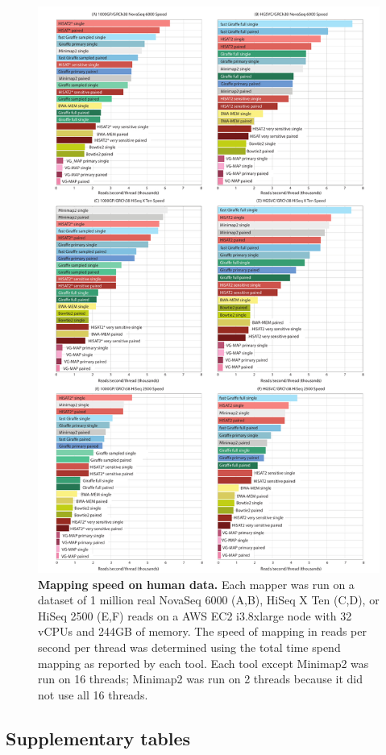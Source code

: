 \documentclass[11pt]{ucscthesis}
\newcommand{\faDownload}{X}
\newcommand{\indexurl}[1]{\href{#1}{\faDownload}}
\begin{document}
\begin{figure}[H]
    \centering
    \includegraphics[width=.75\linewidth]{aim2_supplement_speed.pdf}
    \caption[Mapping speed on human data]{\textbf{Mapping speed on human data.} Each mapper was run on a dataset of 1 million real NovaSeq 6000 (A,B), HiSeq X Ten (C,D), or HiSeq 2500 (E,F) reads on a AWS EC2 i3.8xlarge node with 32 vCPUs and 244GB of memory. The speed of mapping in reads per second per thread was determined using the total time spend mapping as reported by each tool. Each tool except Minimap2 was run on 16 threads; Minimap2 was run on 2 threads because it did not use all 16 threads.}
    \label{fig:aim2_supplement_speed}
\end{figure}

\subsection{Supplementary tables}


\newcommand{\mapindexes}[1]{\indexurl{#1.xg} & \indexurl{#1.gcsa} & \indexurl{#1.gcsa.lcp} & & & &}
\newcommand{\giraffeindexes}[1]{\indexurl{#1.xg} & & & \indexurl{#1.gbwt} & \indexurl{#1.min} & \indexurl{#1.gg} & \indexurl{#1.dist}}
\end{document}
